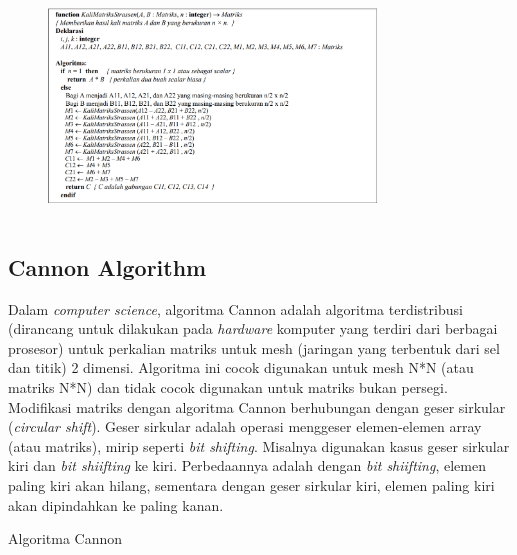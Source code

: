 \documentclass[conference]{IEEEtran}
\begin{document}
\begin{figure}[h]
    \includegraphics[width = 8.7cm, height = 6cm]{Pseudocode_Algoritma_Strassen.png}
    \centering
 \end{figure}

\subsection{Cannon Algorithm}
Dalam \textit{computer science}, algoritma Cannon adalah algoritma terdistribusi (dirancang untuk dilakukan pada \textit{hardware} komputer yang terdiri dari berbagai prosesor)
untuk perkalian matriks untuk mesh (jaringan yang terbentuk dari sel dan titik) 2 dimensi.
Algoritma ini cocok digunakan untuk mesh N*N (atau matriks N*N) dan tidak cocok digunakan untuk matriks bukan persegi.
Modifikasi matriks dengan algoritma Cannon berhubungan dengan geser sirkular (\textit{circular shift}).
Geser sirkular adalah operasi menggeser elemen-elemen array (atau matriks), mirip seperti \textit{bit shifting}.
Misalnya digunakan kasus geser sirkular kiri dan \textit{bit shiifting} ke kiri.
Perbedaannya adalah dengan \textit{bit shiifting}, elemen paling kiri akan hilang, 
sementara dengan geser sirkular kiri, elemen paling kiri akan dipindahkan ke paling kanan.

\begin{algorithm}
    \caption{Algoritma Cannon}
    \\
\end{algorithm}
\end{document}
